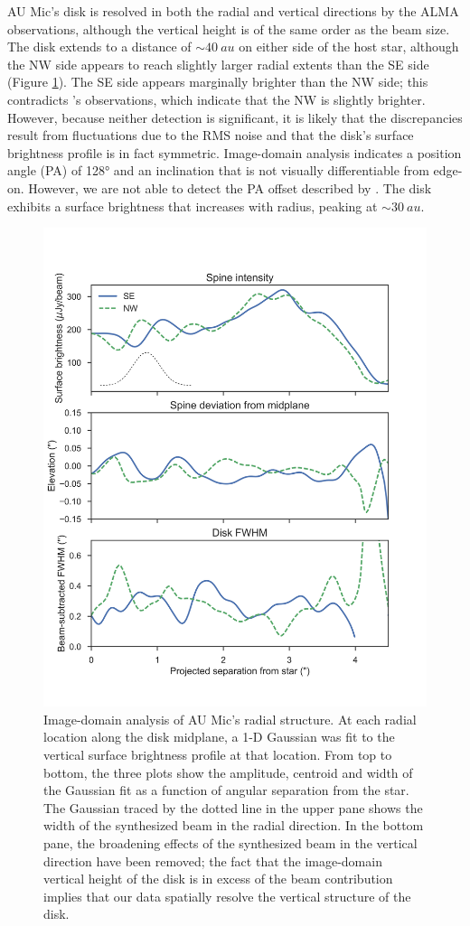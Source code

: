 \documentclass[12pt,oneside]{book}
\begin{document}
AU Mic's disk is resolved in both the radial and vertical directions by the ALMA observations, although the vertical height is of the same order as the beam size. 
The disk extends to a distance of $\sim \SI{40}{au}$ on either side of the host star, although the NW side appears to reach slightly larger radial extents than the SE side (Figure \ref{fig: boccaletti}). 
The SE side appears marginally brighter than the NW side; this contradicts \cite{macgregor13}'s observations, which indicate that the NW is slightly brighter.
However, because neither detection is significant, it is likely that the discrepancies result from fluctuations due to the RMS noise and that the disk's surface brightness profile is in fact symmetric. 
Image-domain analysis indicates a position angle (PA) of \ang{128} and an inclination that is not visually differentiable from edge-on.
However, we are not able to detect the PA offset described by \cite{boccaletti15}. 
The disk exhibits a surface brightness that increases with radius, peaking at $\sim \SI{30}{au}$.

\begin{figure}
  \centering
  \includegraphics[width=.75\linewidth]{figures/3_boccaletti_plots}
  \caption{
  Image-domain analysis of AU Mic's radial structure. 
  At each radial location along the disk midplane, a 1-D Gaussian was fit to the vertical surface brightness profile at that location.
  From top to bottom, the three plots show the amplitude, centroid and width of the Gaussian fit as a function of angular separation from the star. 
  The Gaussian traced by the dotted line in the upper pane shows the width of the  synthesized beam in the radial direction.
  In the bottom pane, the broadening effects of the synthesized beam in the vertical direction have been removed; the fact that the image-domain vertical height of the disk is in excess of the beam contribution implies that our data spatially resolve the vertical structure of the disk.} 
  \label{fig: boccaletti}
\end{figure}
\end{document}
